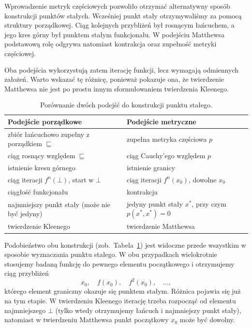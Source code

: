 \documentclass[11pt,a4paper]{article}
\theoremstyle{definition}
\theoremstyle{plain}
\newcommand{\bt}{\bot}                            %
\begin{document}

	Wprowadzenie metryk częściowych pozwoliło otrzymać alternatywny sposób
	konstrukcji punktów stałych. Wcześniej punkt stały otrzymywaliśmy za
	pomocą struktury porządkowej. Ciąg kolejnych przybliżeń był rosnącym
	łańcuchem, a jego kres górny był punktem stałym funkcjonału. W podejściu
	Matthewsa podstawową rolę odgrywa natomiast kontrakcja oraz zupełność
	metryki częściowej.
	
	Oba podejścia wykorzystują zatem iterację funkcji, lecz wymagają
	odmiennych założeń. Warto wskazać tę różnicę, ponieważ pokazuje ona, że
	twierdzenie Matthewsa nie jest po prostu innym sformułowaniem
	twierdzenia Kleenego.
	
	\begin{table}[H]
		\centering
		\begin{tabular}{p{}p{}}
			\hline
			\textbf{Podejście porządkowe} &
			\textbf{Podejście metryczne} \\
			\hline
			zbiór łańcuchowo zupełny z porządkiem $\sqsubseteq$ &
			zupełna metryka częściowa $p$ \\[2mm]
			
			ciąg rosnący względem $\sqsubseteq$ &
			ciąg Cauchy'ego względem $p$ \\[2mm]
			
			istnienie kresu górnego &
			istnienie granicy \\[2mm]
			
			ciąg iteracji $f^n(\bt)$, start w $\bt$ &
			ciąg iteracji $f^n(x_0)$, dowolne $x_0$ \\[2mm]
			
			ciągłość funkcjonału &
			kontrakcja \\[2mm]
			
			najmniejszy punkt stały (może nie być jedyny) &
			jedyny punkt stały $x^*$, przy czym $p(x^*,x^*)=0$ \\[2mm]
			
			twierdzenie Kleenego &
			twierdzenie Matthewsa \\[2mm]
			\hline
		\end{tabular}
		\caption{Porównanie dwóch podejść do konstrukcji punktu stałego.}
		\label{tab:porownanie}
	\end{table}
	
	Podobieństwo obu konstrukcji (zob.\ Tabela~\ref{tab:porownanie}) jest
	widoczne przede wszystkim w sposobie wyznaczania punktu stałego. W obu
	przypadkach wielokrotnie stosujemy badaną funkcję do pewnego elementu
	początkowego i otrzymujemy ciąg przybliżeń
	\[
	x_0,\quad f(x_0),\quad f^2(x_0),\quad\ldots,
	\]
	którego element graniczny okazuje się punktem stałym. Różnica pojawia
	się już na tym etapie. W twierdzeniu Kleenego iterację trzeba rozpocząć
	od elementu najmniejszego $\bt$ (tylko wtedy otrzymujemy łańcuch
	i najmniejszy punkt stały), natomiast w twierdzeniu Matthewsa punkt
	początkowy $x_0$ może być dowolny.
	
\end{document}
